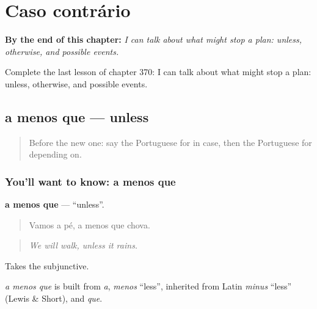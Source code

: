 
\chapter{Caso contrário}
\label{ch:pt-caso-contrario}

\begin{chapteropening}
\textbf{By the end of this chapter:} \emph{I can talk about what might stop a plan: unless, otherwise, and possible events.}

Complete the last lesson of chapter 370: I can talk about what might stop a plan: unless, otherwise, and possible events.
\end{chapteropening}

\section[a menos que]{a menos que — unless}

\label{lesson:PT-C370-a-menos-que}



\begin{quote}
Before the new one: say the Portuguese for in case, then the Portuguese for depending on.
\end{quote}

\subsection*{You'll want to know: a menos que}
\textbf{a menos que} — \textquotedblleft{}unless\textquotedblright{}.

\begin{quote}
Vamos a pé, a menos que chova.
\end{quote}

\begin{quote}
\emph{We will walk, unless it rains.}
\end{quote}

Takes the subjunctive.

\begin{cousinweb}
\emph{a menos que} is built from \emph{a}, \emph{menos} \textquotedblleft{}less\textquotedblright{}, inherited from Latin \emph{minus} \textquotedblleft{}less\textquotedblright{} (Lewis \& Short), and \emph{que}.
\end{cousinweb}

